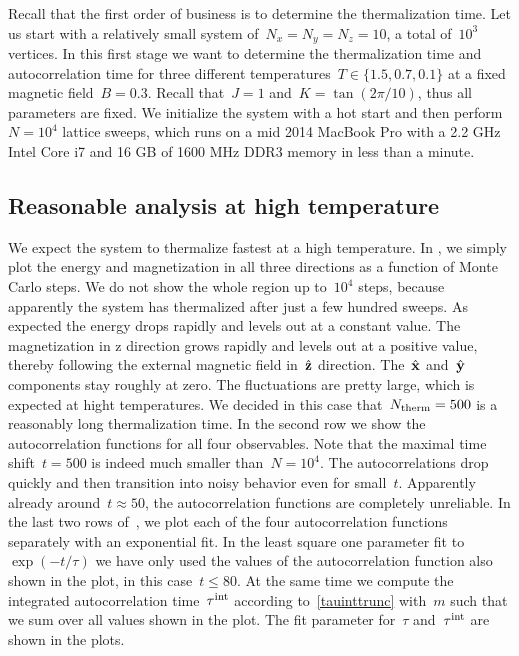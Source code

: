 Recall that the first order of business is to determine the thermalization time.
Let us start with a relatively small system of~$N_x = N_y = N_z = 10$, \ie{} a
total of~$10^3$ vertices. In this first stage we want to determine the
thermalization time and autocorrelation time for three different temperatures~$T
\in \{1.5, 0.7, 0.1\}$ at a fixed magnetic field~$B=0.3$. Recall that~$J=1$
and~$K=\tan(2 \pi / 10)$, thus all parameters are fixed. We initialize the
system with a hot start and then perform~$N=10^4$ lattice sweeps, which runs on
a mid 2014 MacBook Pro with a 2.2 GHz Intel Core i7 and 16 GB of 1600 MHz DDR3
memory in less than a minute.

\subsection{Reasonable analysis at high temperature}

We expect the system to thermalize fastest at a high temperature. In
, we simply plot the energy and magnetization in all three
directions as a function of Monte Carlo steps. We do not show the whole region
up to~$10^4$ steps, because apparently the system has thermalized after just a
few hundred sweeps. As expected the energy drops rapidly and levels out at a
constant value. The magnetization in z direction grows rapidly and levels out at
a positive value, thereby following the external magnetic field in~$\hat{\mathbf{z}}$
direction. The~$\hat{\mathbf{x}}$ and~$\hat{\mathbf{y}}$ components stay roughly at zero. The fluctuations
are pretty large, which is expected at hight temperatures. We decided in this
case that~$N_{\mathrm{therm}} = 500$ is a reasonably long thermalization time. In the
second row we show the autocorrelation functions for all four observables. Note
that the maximal time shift~$t = 500$ is indeed much smaller than~$N = 10^4$.
The autocorrelations drop quickly and then transition into noisy behavior even
for small~$t$. Apparently already around~$t \approx 50$, the autocorrelation
functions are completely unreliable. In the last two rows of~,
we plot each of the four autocorrelation functions separately with an
exponential fit. In the least square one parameter fit to~$\exp(-t/\tau)$ we
have only used the values of the autocorrelation function also shown in the
plot, \ie{} in this case~$t \le 80$. At the same time we compute the integrated
autocorrelation time~$\tau^{\mathrm{int}}$ according to~\eqref{tauinttrunc} with~$m$ such
that we sum over all values shown in the plot. The fit parameter for~$\tau$
and~$\tau^{\mathrm{int}}$ are shown in the plots.

